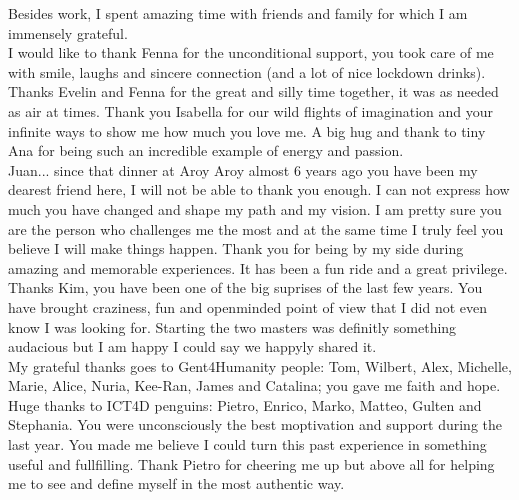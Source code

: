 \begin{acknowledgements}
{Besides work, I spent amazing time with friends and family for which I am immensely grateful.\\
I would like to thank Fenna for the unconditional support, you took care of me with smile, laughs and sincere connection (and a lot of nice lockdown drinks). Thanks Evelin and Fenna for the great and silly time together, it was as needed as air at times. Thank you Isabella for our wild flights of imagination and your infinite ways to show me how much you love me. A big hug and thank to tiny Ana for being such an incredible example of energy and passion. \\
Juan... since that dinner at Aroy Aroy almost 6 years ago you have been my dearest friend here, I will not be able to thank you enough. I can not express how much you have changed and shape my path and my vision. I am pretty sure you are the person who challenges me the most and at the same time I truly feel you believe I will make things happen. Thank you for being by my side during amazing and memorable experiences. It has been a fun ride and a great privilege. \\
Thanks Kim, you have been one of the big suprises of the last few years. You have brought craziness, fun and openminded point of view that I did not even know I was looking for. Starting the two masters was definitly something audacious but I am happy I could say we happyly shared it.\\
My grateful thanks goes to Gent4Humanity people: Tom, Wilbert, Alex, Michelle, Marie, Alice, Nuria, Kee-Ran, James and Catalina; you gave me faith and hope. \\
Huge thanks to ICT4D penguins: Pietro, Enrico, Marko, Matteo, Gulten and Stephania. You were unconsciously the best moptivation and support during the last year. You made me believe I could turn this past experience in something useful and fullfilling. Thank Pietro for cheering me up but above all for helping me to see and define myself in the most authentic way.\\

}
\end{acknowledgements}
